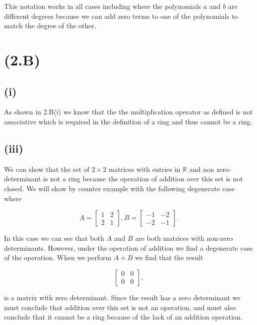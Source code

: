 \documentclass{article}
\begin{document}
      This notation works in all cases including where the polynomials $a$ and $b$ are different degrees because we can add zero terms to one of the polynomials to match the degree of the other.

  \section*{(2.B)}
      \subsection*{(i)}
        As shown in 2.B(i) we know that the the multiplication operator as defined is not associative which is required in the definition of a ring and thus cannot be a ring.
        
      \subsection*{(iii)}
        We can show that the set of $2\times2$ matrices with entries in $\mathbb{R}$ and non zero-determinant is not a ring because the operation of addition over this set is not closed. We will show by counter example with the following degenerate case where

        \[
          A = 
          \begin{bmatrix} 
            1 & 2\\
            2 & 1
          \end{bmatrix},
          B = \begin{bmatrix} 
            -1 & -2\\
            -2 & -1
          \end{bmatrix}.
        \]

        In this case we can see that both $A$ and $B$ are both matrices with non-zero determinants. However, under the operation of addition we find a degenerate case of the operation. When we perform $A+B$ we find that the result

        \[
          \begin{bmatrix} 
            0 & 0\\
            0 & 0
          \end{bmatrix},
        \]

        is a matrix with zero determinant. Since the result has a zero determinant we must conclude that addition over this set is not an operation, and must also conclude that it cannot be a ring because of the lack of an addition operation.
      
\end{document}
